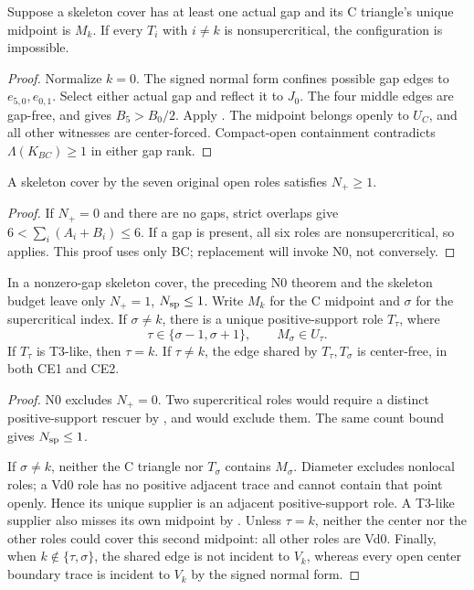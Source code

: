 \begin{theorem}
\label{thm:center-aligned-path}
Suppose a skeleton cover has at least one actual gap and its C triangle's
unique midpoint is $M_k$. If every $T_i$ with $i\ne k$ is nonsupercritical,
the configuration is impossible.
\end{theorem}
\begin{proof}
Normalize $k=0$. The signed normal form confines possible gap edges to
$e_{5,0},e_{0,1}$. Select either actual gap and reflect it to $J_0$.
The four middle edges are gap-free, and
 gives $B_5>B_0/2$.
Apply . The midpoint belongs openly
to $U_C$, and all other witnesses are center-forced. Compact-open
containment contradicts $\Lambda(K_{BC})\ge1$ in either gap rank.
\end{proof}

\begin{theorem}
\label{prop:new-nplus-zero-gap-closures}
\label{thm:fixed-nzero}
A skeleton cover by the seven original open roles satisfies $N_+\ge1$.
\end{theorem}
\begin{proof}
If $N_+=0$ and there are no gaps, strict overlaps give
$6<\sum_i(A_i+B_i)\le6$. If a gap is present, all six roles are
nonsupercritical, so  applies. This proof uses only BC; replacement will invoke N0, not conversely.
\end{proof}

\begin{lemma}
\label{lem:midpoint-supplier}
In a nonzero-gap skeleton cover, the preceding N0 theorem and the skeleton
budget leave only $N_+=1$, $N_{\rm sp}\le1$. Write $M_k$ for the C
midpoint and $\sigma$ for the supercritical index. If $\sigma\ne k$,
there is a unique positive-support role $T_\tau$, where
\[
 \tau\in\{\sigma-1,\sigma+1\},\qquad M_\sigma\in U_\tau.
\]
If $T_\tau$ is T3-like, then $\tau=k$. If $\tau\ne k$, the edge shared
by $T_\tau,T_\sigma$ is center-free, in both CE1 and CE2.
\end{lemma}
\begin{proof}
N0 excludes $N_+=0$. Two supercritical roles would require a distinct
positive-support rescuer by , and
 would exclude them. The same count
bound gives $N_{\rm sp}\le1$.

If $\sigma\ne k$, neither the C triangle nor $T_\sigma$ contains
$M_\sigma$. Diameter excludes nonlocal roles; a Vd0 role has no positive
adjacent trace and cannot contain that point openly. Hence its unique
supplier is an adjacent positive-support role. A T3-like supplier also
misses its own midpoint by . Unless $\tau=k$, neither the center nor the
other roles could cover this second midpoint: all other roles are Vd0.
Finally, when $k\notin\{\tau,\sigma\}$, the shared edge is not incident
to $V_k$, whereas every open center boundary trace is incident to $V_k$
by the signed normal form.
\end{proof}

